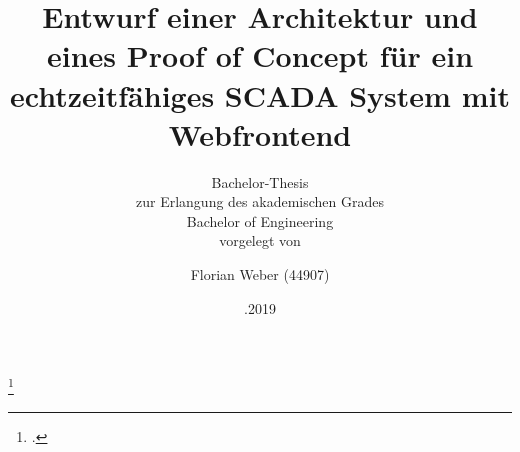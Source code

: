 \documentclass[paper=A4,12pt,twoside,bibliography=totoc,listof=totoc]{scrreprt}
\title{\Huge Entwurf einer Architektur und eines Proof of Concept für ein
echtzeitfähiges SCADA System mit Webfrontend}
\date{\normalfont 12.11.2019}
\author{Florian Weber (44907)}
\subtitle  {\LARGE\vspace{1cm}Bachelor-Thesis \\ \large zur Erlangung des akademischen Grades \\ Bachelor of Engineering \\ \vspace{0.3cm}\normalfont vorgelegt von}
\begin{document}
\maketitle	%

\tableofcontents 	%
\newpage


\newpage

\listoffigures		%
\newpage

\listoftables
\newpage

\newpage
\footcite{entry}
 




\printbibliography

\end{document}
